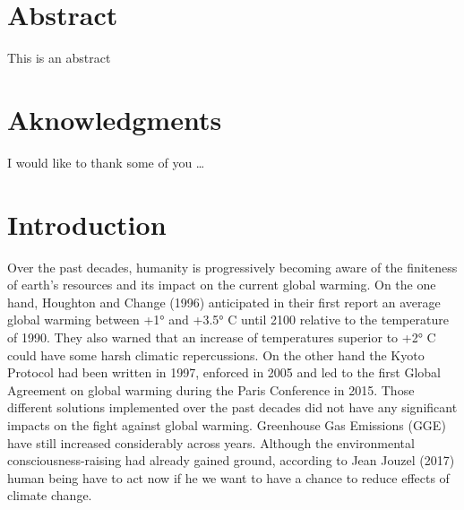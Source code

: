\documentclass[12pt,]{article}
\begin{document}
\pagestyle{fancy}

\fancyhead[LE,RO]{} \fancyhead[LO,RE]{}
\renewcommand{\headrulewidth}{0.4pt} \renewcommand{\footrulewidth}{0pt}



\section*{Abstract}\label{abstract}

This is an abstract

\newpage


\section*{Aknowledgments}\label{aknowledgments}

I would like to thank some of you \ldots{}

\newpage

 \setcounter{tocdepth}{3}
\tableofcontents

\newpage

 \listoftables

\newpage

 \listoffigures

\newpage

 

\section*{Introduction}\label{introduction}

Over the past decades, humanity is progressively becoming aware of the
finiteness of earth's resources and its impact on the current global
warming. On the one hand, Houghton and Change (1996) anticipated in
their first report an average global warming between +1° and +3.5° C
until 2100 relative to the temperature of 1990. They also warned that an
increase of temperatures superior to +2° C could have some harsh
climatic repercussions. On the other hand the Kyoto Protocol had been
written in 1997, enforced in 2005 and led to the first Global Agreement
on global warming during the Paris Conference in 2015. Those different
solutions implemented over the past decades did not have any significant
impacts on the fight against global warming. Greenhouse Gas Emissions
(GGE) have still increased considerably across years. Although the
environmental consciousness-raising had already gained ground, according
to Jean Jouzel (2017) human being have to act now if he we want to have
a chance to reduce effects of climate change.
\end{document}
